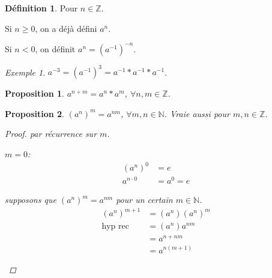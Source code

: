 \documentclass{report}
\newcommand*{\gte}{\geqslant}
\newcommand*{\entiers}{\mathbb{Z}}
\newcommand*{\naturels}{\mathbb{N}}
\newtheorem*{prop}{Proposition}
\theoremstyle{definition}
\newtheorem*{defin}{D\'efinition}
\theoremstyle{remark}
\newtheorem*{exem}{Exemple}
\begin{document}
	\begin{defin}
		Pour $n \in \entiers$.

		Si $n \gte 0$, on a d\'ej\`a d\'efini $a^n$.

		Si $n<0$, on d\'efinit $a^n=(a^{-1})^{-n}$.
	\end{defin}
	\begin{exem}
		$a^{-3}=(a^{-1})^3=a^{-1}*a^{-1}*a^{-1}$.
	\end{exem}
	\begin{prop}
		$a^{n+m}=a^n*a^m$, $\forall n,m \in \entiers$.
	\end{prop}
	\begin{prop}
		$(a^n)^m=a^{nm}$, $\forall m,n \in \naturels$. Vraie aussi pour $m,n \in \entiers$.
		\begin{proof}
			par r\'ecurrence sur $m$.

		\begin{nlist}
			\item $m=0$:
			\begin{align*}
				(a^n)^0&= e\\
				a^{n \cdot 0}&= a^0=e
			\end{align*}
			\item supposons que $(a^n)^m=a^{nm}$ pour un certain $m \in \naturels$.
			\begin{align*}
				(a^n)^{m+1}&= (a^n)(a^n)^m\\
				\text{hyp rec}&= (a^n)a^{nm}\\
				&= a^{n+nm}\\
				&= a^{n(m+1)}
			\end{align*}
		\end{nlist}
		\end{proof}
	\end{prop}
\end{document}
